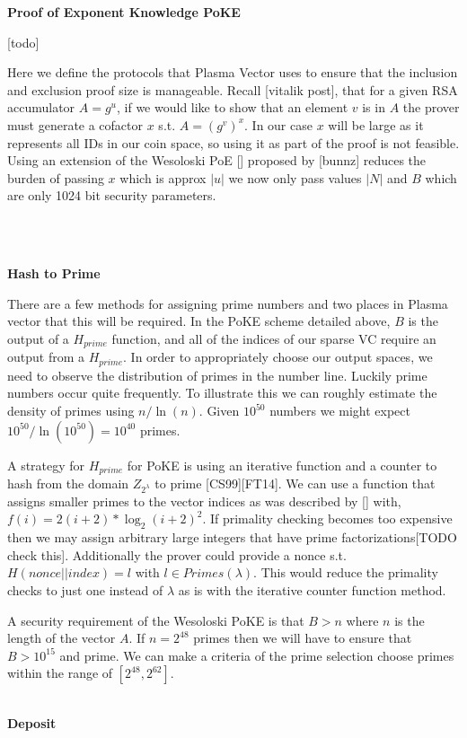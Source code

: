 \documentclass[11pt]{article}
\begin{document}
\centerline{\textbf{Proof of Exponent Knowledge \textbf{PoKE}}}

[todo]

Here we define the protocols that Plasma Vector uses to ensure that the inclusion and exclusion proof size is manageable. Recall [vitalik post], that for a given RSA accumulator $A = g^u$, if we would like to show that an element $v$ is in $A$ the prover must generate a cofactor $x$ s.t. $A = (g^v)^x$. In our case $x$ will be large as it represents all IDs in our coin space, so using it as part of the proof is not feasible. Using an extension of the Wesoloski PoE [] proposed by [bunnz] reduces the burden of passing $x$ which is approx $|u|$ we now only pass values $|N|$ and $B$ which are only 1024 bit security parameters.



\\ 
\\
\centerline{\textbf{Hash to Prime}}

There are a few methods for assigning prime numbers and two places in Plasma vector that this will be required. In the PoKE scheme detailed above, $B$ is the output of a $H_{prime}$ function, and all of the indices of our sparse VC require an output from a $H_{prime}$. In order to appropriately choose our output spaces, we need to observe the distribution of primes in the number line. Luckily prime numbers occur quite frequently. To illustrate this we can roughly estimate the density of primes using $n/\ln(n)$. Given $10^{50}$ numbers we might expect $10^{50}/\ln(10^{50})=10^{40} $ primes.

A strategy for $H_{prime}$ for PoKE is using an iterative function and a counter to hash from the domain $Z_{2^{\lambda}}$ to prime [CS99][FT14]. We can use a function that assigns smaller primes to the vector indices as was described by [] with, $f(i)=2(i+2)* \log_2(i+2)^2$. If primality checking becomes too expensive then we may assign arbitrary large integers that have prime factorizations[TODO check this]. Additionally the prover could provide a nonce s.t. $H(nonce||index)=l$ with $l \in Primes(\lambda)$. This would reduce the primality checks to just one instead of $\lambda$ as is with the iterative counter function method.

A security requirement of the Wesoloski PoKE is that $B > n$ where $n$ is the length of the vector $A$. If $n=2^{48}$ primes then we will have to ensure that $B > 10^{15}$ and prime. We can make a criteria of the prime selection choose primes within the range of $[2^{48}, 2^{62}]$.
\\
\\
\centerline{\textbf{Deposit}}
\end{document}
